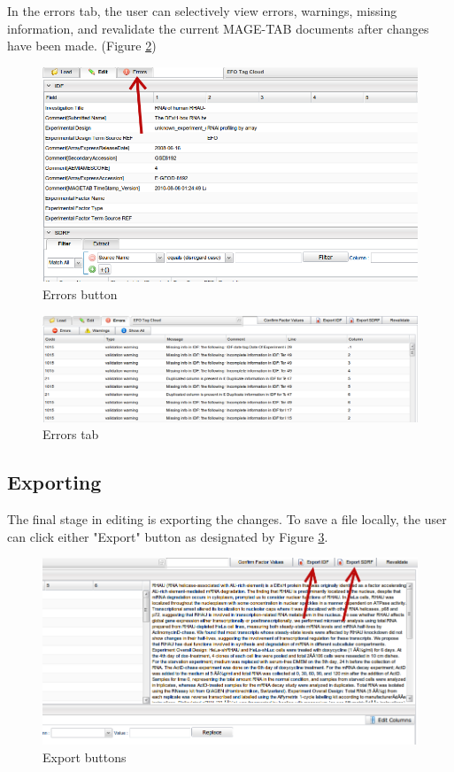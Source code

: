 \documentclass[a4paper]{article}
\begin{document}
In the errors tab, the user can selectively view errors, warnings, missing information, and revalidate the current MAGE-TAB documents after changes have been made. (Figure \ref{errorstab})

\begin{figure}[h]
\caption{Errors button}
\centering
\label{errors}
\includegraphics[width=17cm]{images/errors}
\end{figure}

\begin{figure}[h]
\caption{Errors tab}
\centering
\label{errorstab}
\includegraphics[width=17cm]{images/errors_tab}
\end{figure}

\subsection{Exporting}
The final stage in editing is exporting the changes. To save a file locally, the user can click either "Export" button as designated by Figure \ref{export}.

\begin{figure}[h]
\caption{Export buttons}
\centering
\label{export}
\includegraphics[width=17cm]{images/export}
\end{figure}
\end{document}
